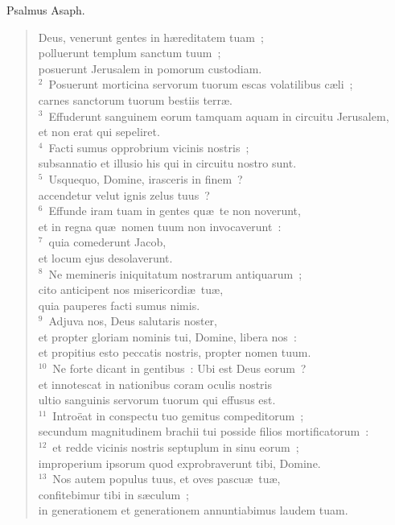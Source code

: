 \lettrine[lines=3,image=true,loversize=0.05,lraise=-0.03]{P}{}salmus Asaph. \begin{flushleft}\begin{verse}\vspace{6pt}Deus, venerunt gentes in h\ae reditatem tuam~;\\ polluerunt templum sanctum tuum~;\\ posuerunt Jerusalem in pomorum custodiam.\\
${}^{2}$~Posuerunt morticina servorum tuorum escas volatilibus c\ae li~;\\ carnes sanctorum tuorum bestiis terr\ae .\\
${}^{3}$~Effuderunt sanguinem eorum tamquam aquam in circuitu Jerusalem,\\ et non erat qui sepeliret.\\
${}^{4}$~Facti sumus opprobrium vicinis nostris~;\\ subsannatio et illusio his qui in circuitu nostro sunt.\\
${}^{5}$~Usquequo, Domine, irasceris in finem~?\\ accendetur velut ignis zelus tuus~?\\
${}^{6}$~Effunde iram tuam in gentes qu\ae\ te non noverunt,\\ et in regna qu\ae\ nomen tuum non invocaverunt~:\\
${}^{7}$~quia comederunt Jacob,\\ et locum ejus desolaverunt.\\
${}^{8}$~Ne memineris iniquitatum nostrarum antiquarum~;\\ cito anticipent nos misericordi\ae\ tu\ae ,\\ quia pauperes facti sumus nimis.\\
${}^{9}$~Adjuva nos, Deus salutaris noster,\\ et propter gloriam nominis tui, Domine, libera nos~:\\ et propitius esto peccatis nostris, propter nomen tuum.\\
${}^{10}$~Ne forte dicant in gentibus~: Ubi est Deus eorum~?\\ et innotescat in nationibus coram oculis nostris\\ ultio sanguinis servorum tuorum qui effusus est.\\
${}^{11}$~Intro\"eat in conspectu tuo gemitus compeditorum~;\\ secundum magnitudinem brachii tui posside filios mortificatorum~:\\
${}^{12}$~et redde vicinis nostris septuplum in sinu eorum~;\\ improperium ipsorum quod exprobraverunt tibi, Domine.\\
${}^{13}$~Nos autem populus tuus, et oves pascu\ae\ tu\ae ,\\ confitebimur tibi in s\ae culum~;\\ in generationem et generationem annuntiabimus laudem tuam.\end{verse}\end{flushleft}



